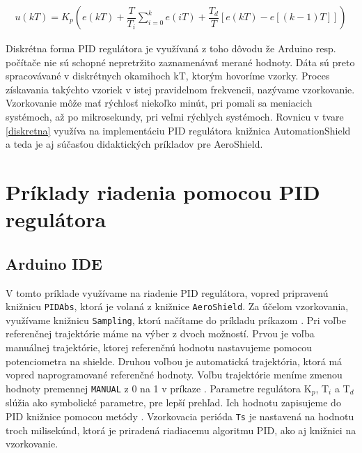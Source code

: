 \begin{align}
	\label{diskretna}
	u(kT)=K_p \left(e(kT) + \dfrac{T}{T_i} \sum_{i=0}^{k}  e(iT) + \dfrac{T_d}{T} \left[e(kT)-e \left[(k - 1)T\right] \right] \right)
\end{align}

Diskrétna forma PID regulátora je využívaná z toho dôvodu že Arduino resp. počítače nie sú schopné nepretržito zaznamenávať merané hodnoty. Dáta sú preto spracovávané v diskrétnych okamihoch kT, ktorým hovoríme vzorky. Proces získavania takýchto vzoriek v istej pravidelnom frekvencii, nazývame vzorkovanie. Vzorkovanie môže mať rýchlosť niekoľko minút, pri pomali sa meniacich systémoch, až po mikrosekundy, pri veľmi rýchlych systémoch. Rovnicu v tvare \ref{diskretna} využíva na implementáciu PID regulátora knižnica AutomationShield a teda je aj súčasťou didaktických príkladov pre AeroShield. 

\section{Príklady riadenia pomocou PID regulátora}
\subsection{Arduino IDE}

V tomto príklade využívame na riadenie PID regulátora, vopred pripravenú knižnicu \verb|PIDAbs|, ktorá je volaná z knižnice \verb|AeroShield|. Za účelom vzorkovania, využívame knižnicu \verb|Sampling|, ktorú načítame do príkladu príkazom . Pri voľbe referenčnej trajektórie máme na výber z dvoch možností. Prvou je voľba manuálnej trajektórie, ktorej referenčnú hodnotu nastavujeme pomocou potenciometra na shielde. Druhou voľbou je automatická trajektória, ktorá má vopred naprogramované referenčné hodnoty. Voľbu trajektórie meníme zmenou hodnoty premennej \verb|MANUAL| z 0 na 1 v príkaze . Parametre regulátora K$_p$, T$_i$ a T$_d$ slúžia ako symbolické parametre, pre lepší prehľad. Ich hodnotu zapisujeme do PID knižnice pomocou metódy . Vzorkovacia perióda \verb|Ts| je nastavená na hodnotu troch milisekúnd, ktorá je priradená riadiacemu algoritmu PID, ako aj knižnici na vzorkovanie. 

